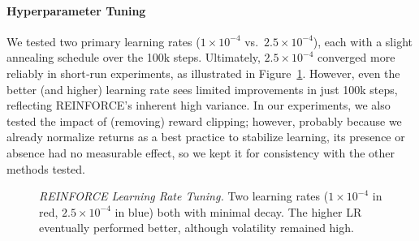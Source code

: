 \paragraph{Hyperparameter Tuning}
We tested two primary learning rates ($1\times10^{-4}$ vs.\ $2.5\times10^{-4}$), each with a slight annealing schedule over the 100k steps. 
Ultimately, $2.5\times10^{-4}$ converged more reliably in short‐run experiments, as illustrated in Figure~\ref{fig:reinforce_lr_tuning}. 
However, even the better (and higher) learning rate sees limited improvements in just 100k steps, reflecting REINFORCE's inherent high variance.
In our experiments, we also tested the impact of (removing) reward clipping; however, probably because we already normalize returns as a best practice to stabilize learning, its presence or absence had no measurable effect, so we kept it for consistency with the other methods tested.
\begin{figure}
	\centering
	\quad
	\caption{\emph{REINFORCE Learning Rate Tuning.} Two learning rates ($1\times10^{-4}$ in red, $2.5\times10^{-4}$ in blue) 
		both with minimal decay. The higher LR eventually performed better, although volatility remained high.}
	\label{fig:reinforce_lr_tuning}
\end{figure}

